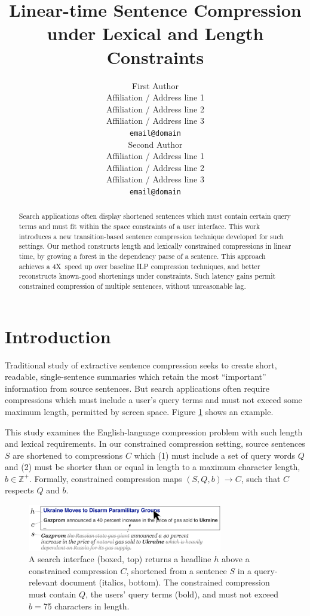 \documentclass[11pt,a4paper]{article}
\title{Linear-time Sentence Compression under Lexical and Length Constraints}
\author{First Author \\
  Affiliation / Address line 1 \\
  Affiliation / Address line 2 \\
  Affiliation / Address line 3 \\
  {\tt email@domain} \\\And
  Second Author \\
  Affiliation / Address line 1 \\
  Affiliation / Address line 2 \\
  Affiliation / Address line 3 \\
  {\tt email@domain} \\}
\date{}
\newcommand{\speedup}[0]{4X~}
\begin{document}
\maketitle

\begin{abstract}
Search applications often display shortened sentences which must contain certain query terms and must fit within the space constraints of a user interface. This work introduces a new transition-based sentence compression technique developed for such settings. Our method constructs length and lexically constrained compressions in linear time, by growing a forest in the dependency parse of a sentence. This approach achieves a \speedup speed up over baseline ILP compression techniques, and better reconstructs known-good shortenings under constraints. Such latency gains permit constrained compression of multiple sentences, without unreasonable lag.
\end{abstract}


\section{Introduction}\label{s:intro}

Traditional study of extractive sentence compression seeks to create short, readable, single-sentence summaries which retain the most ``important'' information from source sentences. But search applications often require compressions which must include a user's query terms and must not exceed some maximum length, permitted by screen space.  Figure \ref{f:qf} shows an example.

This study examines the English-language compression problem with such length and lexical requirements. In our constrained compression setting, source sentences $S$ are shortened to compressions $C$ which (1) must include a set of query words $Q$ and (2) must be shorter than or equal in length to a maximum character length, $b \in \mathbb{Z}^{+}$. Formally, constrained compression maps $(S,Q,b) \rightarrow C$, such that $C$ respects $Q$ and $b$.

\begin{figure}[htb!]
\includegraphics[width=8.5cm]{qf.pdf}
\caption{A search interface (boxed, top) returns a headline $h$ above a constrained compression $C$, shortened from a sentence $S$ in a query-relevant document (italics, bottom). The constrained compression must contain $Q$, the users' query terms (bold), and must not exceed $b=$75 characters in length.}
\label{f:qf}
\end{figure}
\end{document}

